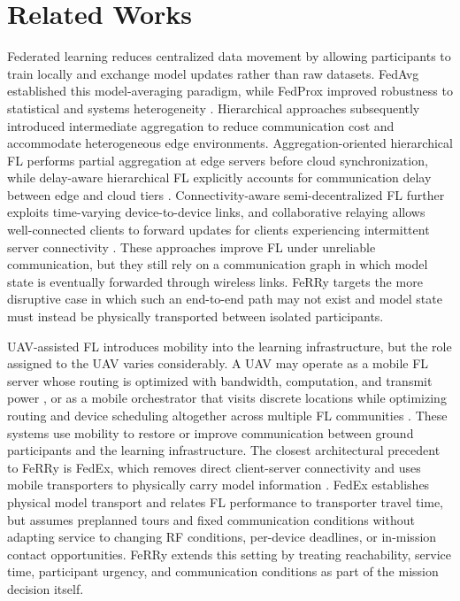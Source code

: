 \documentclass[conference]{IEEEtran}
\begin{document}
\section{Related Works}
\label{sec:related_works}

Federated learning reduces centralized data movement by allowing participants to train locally and exchange model updates rather than raw datasets. FedAvg established this model-averaging paradigm, while FedProx improved robustness to statistical and systems heterogeneity \cite{mcmahan2017communication,li2020federated}. Hierarchical approaches subsequently introduced intermediate aggregation to reduce communication cost and accommodate heterogeneous edge environments. Aggregation-oriented hierarchical FL performs partial aggregation at edge servers before cloud synchronization, while delay-aware hierarchical FL explicitly accounts for communication delay between edge and cloud tiers \cite{liu2020client,lin2023delay}. Connectivity-aware semi-decentralized FL further exploits time-varying device-to-device links, and collaborative relaying allows well-connected clients to forward updates for clients experiencing intermittent server connectivity \cite{parasnis2023connectivity,yemini2023robust}. These approaches improve FL under unreliable communication, but they still rely on a communication graph in which model state is eventually forwarded through wireless links. FeRRy targets the more disruptive case in which such an end-to-end path may not exist and model state must instead be physically transported between isolated participants.

UAV-assisted FL introduces mobility into the learning infrastructure, but the role assigned to the UAV varies considerably. A UAV may operate as a mobile FL server whose routing is optimized with bandwidth, computation, and transmit power \cite{zhang2025latency}, or as a mobile orchestrator that visits discrete locations while optimizing routing and device scheduling altogether across multiple FL communities \cite{mestoukirdi2022uav}.  These systems use mobility to restore or improve communication between ground participants and the learning infrastructure. The closest architectural precedent to FeRRy is FedEx, which removes direct client-server connectivity and uses mobile transporters to physically carry model information \cite{bian2025indirect}. FedEx establishes physical model transport and relates FL performance to transporter travel time, but assumes preplanned tours and fixed communication conditions without adapting service to changing RF conditions, per-device deadlines, or in-mission contact opportunities. FeRRy extends this setting by treating reachability, service time, participant urgency, and communication conditions as part of the mission decision itself.
\end{document}
